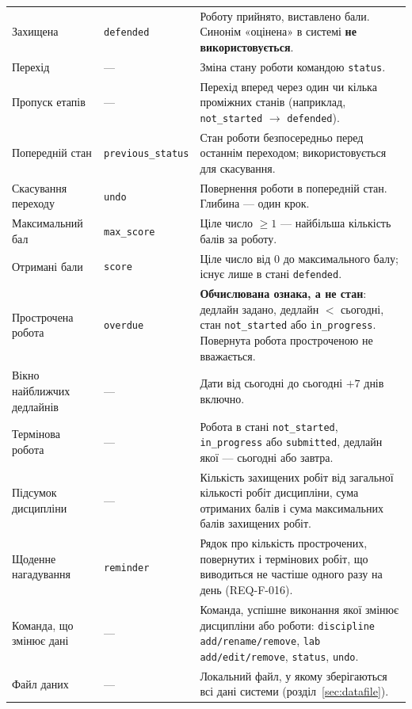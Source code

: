 \documentclass[12pt,a4paper]{article}
\newcommand{\code}[1]{\texttt{#1}}
\begin{document}
\begin{longtable}{>{\raggedright}p{} >{\raggedright}p{} p{}}
Захищена & \code{defended} & Роботу прийнято, виставлено бали. Синонім «оцінена» в системі \textbf{не використовується}. \\
Перехід & --- & Зміна стану роботи командою \code{status}. \\
Пропуск етапів & --- & Перехід вперед через один чи кілька проміжних станів (наприклад, \code{not\_started} $\to$ \code{defended}). \\
Попередній стан & \code{previous\_status} & Стан роботи безпосередньо перед останнім переходом; використовується для скасування. \\
Скасування переходу & \code{undo} & Повернення роботи в попередній стан. Глибина --- один крок. \\
Максимальний бал & \code{max\_score} & Ціле число $\ge 1$ --- найбільша кількість балів за роботу. \\
Отримані бали & \code{score} & Ціле число від 0 до максимального балу; існує лише в стані \code{defended}. \\
Прострочена робота & \code{overdue} & \textbf{Обчислювана ознака, а не стан}: дедлайн задано, дедлайн $<$ сьогодні, стан \code{not\_started} або \code{in\_progress}. Повернута робота простроченою не вважається. \\
Вікно найближчих дедлайнів & --- & Дати від сьогодні до сьогодні $+ 7$ днів включно. \\
Термінова робота & --- & Робота в стані \code{not\_started}, \code{in\_progress} або \code{submitted}, дедлайн якої --- сьогодні або завтра. \\
Підсумок дисципліни & --- & Кількість захищених робіт від загальної кількості робіт дисципліни, сума отриманих балів і сума максимальних балів захищених робіт. \\
Щоденне нагадування & \code{reminder} & Рядок про кількість прострочених, повернутих і термінових робіт, що виводиться не частіше одного разу на день (REQ-F-016). \\
Команда, що змінює дані & --- & Команда, успішне виконання якої змінює дисципліни або роботи: \code{discipline add/rename/remove}, \code{lab add/edit/remove}, \code{status}, \code{undo}. \\
Файл даних & --- & Локальний файл, у якому зберігаються всі дані системи (розділ~\ref{sec:datafile}). \\
\bottomrule
\end{longtable}
\end{document}
